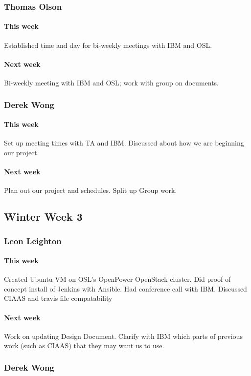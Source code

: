 \documentclass[10pt,letterpaper,onecolumn,draftclsnofoot]{IEEEtran}
\begin{document}
\subsubsection{Thomas Olson}
\paragraph{This week}Established time and day for bi-weekly meetings with IBM and OSL.
\paragraph{Next week}Bi-weekly meeting with IBM and OSL; work with group on documents.


\subsubsection{Derek Wong}
\paragraph{This week}Set up meeting times with TA and IBM\@.
Discussed about how we are beginning our project.
\paragraph{Next week}Plan out our project and schedules.
Split up Group work.

\subsection{Winter Week 3}
\subsubsection{Leon Leighton}
\paragraph{This week}Created Ubuntu VM on OSL's OpenPower OpenStack cluster.  
Did proof of concept install of Jenkins with Ansible.  
Had conference call with IBM. Discussed CIAAS and travis file compatability 
\paragraph{Next week}Work on updating Design Document. 
Clarify with IBM which parts of previous work (such as CIAAS) that they may want us to use.


\subsubsection{Derek Wong}
\end{document}

